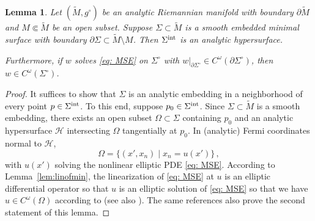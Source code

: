 \documentclass[11pt]{amsart}
\newtheorem{Lemma}[Theorem]{Lemma}
\theoremstyle{definition}
\numberwithin{equation}{section}
\newcommand{\p}{\partial}
\begin{document}
\begin{Lemma}
    \label{lem: min surfs are analytic}
    Let $(\widetilde{M}, g^\circ)$ be an analytic Riemannian manifold with boundary $\partial \widetilde{M}$ and $M\Subset \widetilde{M}$ be an open subset. Suppose $\Sigma \subset \widetilde{M}$ is a smooth embedded minimal surface with boundary $\partial{\Sigma}\subset \widetilde{M}\setminus M$. Then $\Sigma^{\rm int}$ is an analytic hypersurface.  

    Furthermore, if $w$ solves \eqref{eq: MSE} on $\Sigma^\circ$ with $w\vert_{\p\Sigma^\circ}\in C^\omega(\p\Sigma^\circ)$, then $w\in C^\omega(\Sigma^\circ)$. 
\end{Lemma}
\begin{proof}
It suffices to show that $\Sigma$ is an analytic embedding in a neighborhood of every point $p\in \Sigma^{\rm int}$. To this end, suppose $p_0\in \Sigma^{\rm int}$. Since $\Sigma\subset \widetilde{M}$ is a smooth embedding, there exists an open subset $\Omega \subset \Sigma$ containing $p_0$ and an analytic hypersurface $\mathcal H$ intersecting $\Omega$ tangentially at $p_0$. In (analytic) Fermi coordinates normal to $\mathcal H$,
$$\Omega = \{(x', x_n) \mid x_n = u(x')\}\,,$$
with $u(x')$ solving the nonlinear elliptic PDE \eqref{eq: MSE}. According to Lemma~\ref{lem:linofmin}, the linearization of \eqref{eq: MSE} at $u$ is an elliptic differential operator so that $u$ is an elliptic solution of \eqref{eq: MSE} so that we have  $u\in C^\omega(\Omega)$ according to \cite[Appdx.~Thm.~41]{MR867684} (see also \cite[Cor.~1.4]{arXiv:1506.06224}). The same references also prove the second statement of this lemma.
\end{proof}
\end{document}
